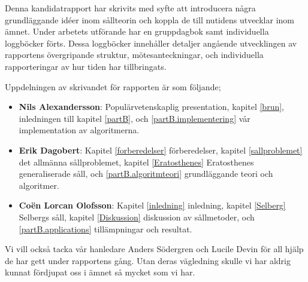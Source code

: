 Denna kandidatrapport har skrivits med syfte att introducera några grundläggande idéer inom sållteorin och koppla de till nutidens utvecklar inom ämnet.
Under arbetets utförande har en gruppdagbok samt individuella loggböcker förts.
Dessa loggböcker innehåller detaljer angående utvecklingen av rapportens övergripande struktur, mötesanteckningar, och individuella rapporteringar av hur tiden har tillbringats.

Uppdelningen av skrivandet för rapporten är som följande;
\begin{itemize}
    \item \textbf{Nils Alexandersson}: Populärvetenskaplig presentation, kapitel \ref{brun}, inledningen till kapitel \ref{partB}, och \ref{partB.implementering} vår implementation av algoritmerna.
    \item \textbf{Erik Dagobert}: Kapitel \ref{forberedelser} förberedelser, kapitel \ref{sallproblemet} det allmänna sållproblemet, kapitel \ref{Eratosthenes} Eratosthenes generaliserade såll, och \ref{partB.algoritmteori} grundläggande teori och algoritmer. 
    \item \textbf{Coën Lorcan Olofsson}: Kapitel \ref{inledning} inledning, kapitel \ref{Selberg} Selbergs såll, kapitel \ref{Diskussion} diskussion av sållmetoder, och \ref{partB.applications} tillämpningar och resultat.
\end{itemize}
Vi vill också tacka vår hanledare Anders Södergren och Lucile Devin för all hjälp de har gett under rapportens gång. 
Utan deras vägledning skulle vi har aldrig kunnat fördjupat oss i ämnet så mycket som vi har.